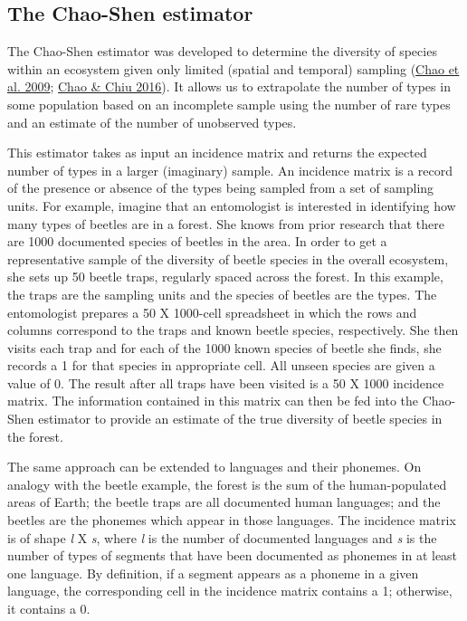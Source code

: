 \documentclass[
]{article}
\begin{document}
\hypertarget{the-chao-shen-estimator}{%
\subsection{The Chao-Shen estimator}\label{the-chao-shen-estimator}}

The Chao-Shen estimator was developed to determine the diversity of
species within an ecosystem given only limited (spatial and temporal)
sampling (\protect\hyperlink{ref-Chao_etal2009}{Chao et al. 2009};
\protect\hyperlink{ref-ChaoChiu2016}{Chao \& Chiu 2016}). It allows us
to extrapolate the number of types in some population based on an
incomplete sample using the number of rare types and an estimate of the
number of unobserved types.

This estimator takes as input an incidence matrix and returns the
expected number of types in a larger (imaginary) sample. An incidence
matrix is a record of the presence or absence of the types being sampled
from a set of sampling units. For example, imagine that an entomologist
is interested in identifying how many types of beetles are in a forest.
She knows from prior research that there are 1000 documented species of
beetles in the area. In order to get a representative sample of the
diversity of beetle species in the overall ecosystem, she sets up 50
beetle traps, regularly spaced across the forest. In this example, the
traps are the sampling units and the species of beetles are the types.
The entomologist prepares a 50 X 1000-cell spreadsheet in which the rows
and columns correspond to the traps and known beetle species,
respectively. She then visits each trap and for each of the 1000 known
species of beetle she finds, she records a 1 for that species in
appropriate cell. All unseen species are given a value of 0. The result
after all traps have been visited is a 50 X 1000 incidence matrix. The
information contained in this matrix can then be fed into the Chao-Shen
estimator to provide an estimate of the true diversity of beetle species
in the forest.

The same approach can be extended to languages and their phonemes. On
analogy with the beetle example, the forest is the sum of the
human-populated areas of Earth; the beetle traps are all documented
human languages; and the beetles are the phonemes which appear in those
languages. The incidence matrix is of shape \emph{l} X \emph{s}, where
\emph{l} is the number of documented languages and \emph{s} is the
number of types of segments that have been documented as phonemes in at
least one language. By definition, if a segment appears as a phoneme in
a given language, the corresponding cell in the incidence matrix
contains a 1; otherwise, it contains a 0.
\end{document}
